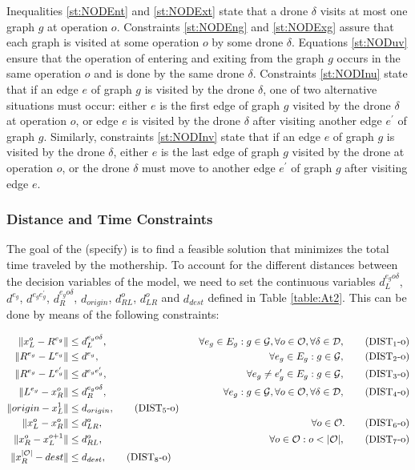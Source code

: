\noindent 
 Inequalities \eqref{st:NODEnt} and \eqref{st:NODExt} state that a drone $\delta$ visits at most one graph $g$ at operation $o$.  Constraints \eqref{st:NODEng} and \eqref{st:NODExg} assure that each graph is visited at some operation $o$ by some drone $\delta$. Equations \eqref{st:NODuv} ensure that the operation of entering and exiting from the graph $g$ occurs in the same operation $o$ and is done by the same drone $\delta$. Constraints \eqref{st:NODInu} state that if an edge $e$ of graph $g$ is visited by the drone $\delta$, one of two alternative situations must occur: either $e$ is the first edge of graph $g$ visited by the drone $\delta$ at operation $o$, or edge $e$ is visited by the drone $\delta$ after visiting another edge $e^\prime$ of graph $g$. Similarly, constraints \eqref{st:NODInv} state that if an edge $e$ of graph $g$ is visited by the drone $\delta$, either $e$ is the last edge of graph $g$ visited by the drone at operation $o$, or the drone $\delta$ must move to another edge $e^\prime$ of graph $g$ after visiting edge $e$.

\subsubsection*{Distance and Time Constraints}
\noindent
 The goal of the \AMD\xspace (specify) is to find a feasible solution that minimizes the total time traveled by the mothership. To account for the different distances between the decision variables of the model, we need to set the continuous variables $d_L^{e_go\delta}$, $d^{e_g}$, $d^{e_ge^\prime_g}$, $d_R^{e_go\delta}$, $d_{origin}$, $d_{RL}^o$, $d_{LR}^o$ and $d_{dest}$ defined in Table \ref{table:At2}. This can be done by means of the following constraints:
 

\begin{align*}
\|x_L^o- R^{e_g}\| & \leq  d_L^{e_go\delta},  &\quad \forall e_g\in E_g:g\in \mathcal{G}, \forall o\in \mathcal O, \forall \delta\in\mathcal D, \tag{DIST$_{1}$-o} \label{eq:NOd1}\\
\|R^{e_g}- L^{e_g}\| & \leq  d^{e_g},  &\quad \forall e_g\in E_g:g\in \mathcal{G}, \tag{DIST$_{2}$-o} \label{eq:NOd2}\\
\|R^{e_g}- L^{e^\prime_g}\| & \leq  d^{e_ge^\prime_g}, &\quad \forall e_g\neq e_g'\in E_g:g\in \mathcal{G}, \tag{DIST$_{3}$-o} \label{eq:NOd3}\\
\|L^{e_g}- x_R^o\| & \leq  d_R^{e_go\delta}, &\quad \forall e_g:g\in \mathcal{G},\forall o\in \mathcal O, \forall \delta\in\mathcal D, \tag{DIST$_{4}$-o} \label{eq:NOd4}\\
\|origin - x_L^1\| & \leq d_{origin}, \tag{DIST$_5$-o}\label{eq:NOd5}\\
\|x_L^o- x_R^o\| & \leq  d_{LR}^o, & \quad \forall o\in \mathcal O. \tag{DIST$_{6}$-o} \label{eq:NOd6}\\
\|x_R^o- x_L^{o+1}\| & \leq  d_{RL}^o, & \quad \forall o\in \mathcal O:o<|\mathcal O|, \tag{DIST$_{7}$-o} \label{eq:NOd7}\\
\|x_R^{|\mathcal O|} - dest\| & \leq d_{dest}, \tag{DIST$_8$-o}\label{eq:NOd8}\\
\end{align*}

